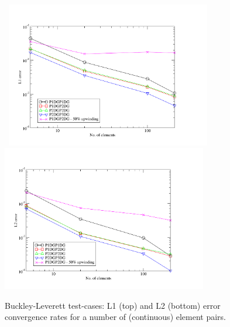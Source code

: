 \begin{figure}[h]
\vbox{\hbox{\hspace{1.cm}
    \includegraphics[width=0.8\textwidth]{L1_convergence_rate}}
\vspace{.0cm}\hbox{\hspace{1.cm}
    \includegraphics[width=0.8\textwidth]{L2_convergence_rate}}}
    \caption{Buckley-Leverett test-cases: L1 (top) and L2 (bottom) error convergence rates for a number of (continuous) element pairs. \label{fig:BL_converg-rates}}
\end{figure}



